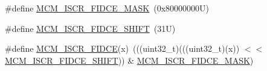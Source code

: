 \begin{DoxyCompactItemize}
\item 
\#define \mbox{\hyperlink{group___m_c_m___register___masks_ga0dc0741a93b687a65f28c5a1e109ba6e}{M\+C\+M\+\_\+\+I\+S\+C\+R\+\_\+\+F\+I\+D\+C\+E\+\_\+\+M\+A\+SK}}~(0x80000000\+U)
\item 
\#define \mbox{\hyperlink{group___m_c_m___register___masks_ga19c565ce09db7c0d22bf65f93d9aabfc}{M\+C\+M\+\_\+\+I\+S\+C\+R\+\_\+\+F\+I\+D\+C\+E\+\_\+\+S\+H\+I\+FT}}~(31\+U)
\item 
\#define \mbox{\hyperlink{group___m_c_m___register___masks_ga99c7d9843151186be126c062b32deb34}{M\+C\+M\+\_\+\+I\+S\+C\+R\+\_\+\+F\+I\+D\+CE}}(x)~(((uint32\+\_\+t)(((uint32\+\_\+t)(x)) $<$$<$ \mbox{\hyperlink{group___m_c_m___register___masks_ga19c565ce09db7c0d22bf65f93d9aabfc}{M\+C\+M\+\_\+\+I\+S\+C\+R\+\_\+\+F\+I\+D\+C\+E\+\_\+\+S\+H\+I\+FT}})) \& \mbox{\hyperlink{group___m_c_m___register___masks_ga0dc0741a93b687a65f28c5a1e109ba6e}{M\+C\+M\+\_\+\+I\+S\+C\+R\+\_\+\+F\+I\+D\+C\+E\+\_\+\+M\+A\+SK}})
\end{DoxyCompactItemize}
